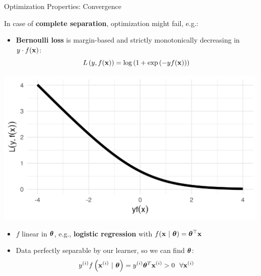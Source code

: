 \documentclass[11pt,compress,t,notes=noshow, xcolor=table]{beamer}
\begin{document}
\begin{vbframe}{Optimization Properties: Convergence}

\footnotesize

In case of \textbf{complete separation}, optimization might 
fail, e.g.:

\vspace{0.5cm}

\begin{minipage}{0.7\textwidth}
  \begin{itemize}
    \item \textbf{Bernoulli loss} is margin-based and strictly monotonically decreasing in
    $y \cdot f(\mathbf{x})$: 
    $$L\left(y, f(\mathbf{x})\right) = \log \left( 1 + \exp \left( - y  f(\mathbf{x}) \right)\right)$$
  \end{itemize}
\end{minipage}%
\begin{minipage}{0.05\textwidth}
  \phantom{foo}
\end{minipage}%
\begin{minipage}{0.25\textwidth}
  \includegraphics[width=\textwidth]{figure/bernoulli.png}
\end{minipage}%

\begin{itemize}
  \item $f$ linear in $\bm{\theta}$, e.g.,
  \textbf{logistic regression} with $f(\mathbf{x} ~|~ \bm{\theta}) = \bm{\theta}^\top \mathbf{x}$
  \item Data perfectly separable by our learner, so we can find $\bm{\theta}$:
   $$ y^{(i)} f\left(\mathbf{x}^{(i)} ~|~ \bm{\theta}\right) = y^{(i)} \bm{\theta}^T \mathbf{x}^{(i)} > 0 ~~ \forall \mathbf{x}^{(i)}$$


\end{itemize}
\end{vbframe}
\end{document}
